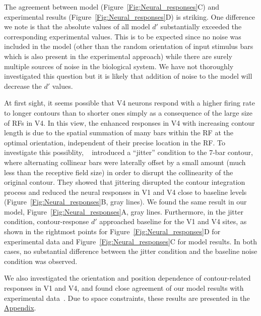 The agreement between model (Figure~\ref{Fig:Neural_responses}C) and
experimental results (Figure~\ref{Fig:Neural_responses}D) is striking.
One difference we note is that the absolute values of all model $d'$
substantially exceeded the corresponding experimental values. 
This is to be expected since no noise was included in the model 
(other than the random orientation of input
stimulus bars which is also present in the experimental approach)
while there are surely multiple sources of noise in the biological
system. We have not thoroughly investigated this question but it is
likely that addition of noise to the model will decrease the $d'$
values.

At first sight, it seems possible that 
V4 neurons respond with a higher firing rate to longer contours than
to shorter ones simply as a consequence of 
the large size of RFs in V4. 
In this view, the enhanced responses in V4 with increasing contour
length is due to the spatial summation of many bars
within the RF at the optimal orientation,
independent of their precise location in the RF. 
To  investigate this possiblity,
~\cite{Chen_etal14} introduced a ``jitter'' condition to the 7-bar
contour, where alternating collinear bars were laterally offset 
by a small amount (much less than the receptive field size)
in order to disrupt the collinearity of the original contour. They
showed that jittering disrupted the 
contour integration process and reduced the neural responses in V1
and V4 close to baseline levels (Figure~\ref{Fig:Neural_responses}B,
gray lines). We found the same result in our model,
Figure~\ref{Fig:Neural_responses}A, gray lines.  Furthermore, in the
jitter condition, contour-response $d'$ approached baseline for the
V1 and V4 sites, as shown in the rightmost points for
Figure~\ref{Fig:Neural_responses}D for experimental data and
Figure~\ref{Fig:Neural_responses}C for model results. In both cases,
no substantial difference between the jitter condition and the
baseline noise condition was observed.

We also investigated the orientation and position dependence of
contour-related responses in V1 and V4, and found close agreement of
our model results with experimental data~\citep{Chen_etal14}. Due
to space constraints, these results are presented in the \hyperref[sec:appendix_fig]{Appendix}.

